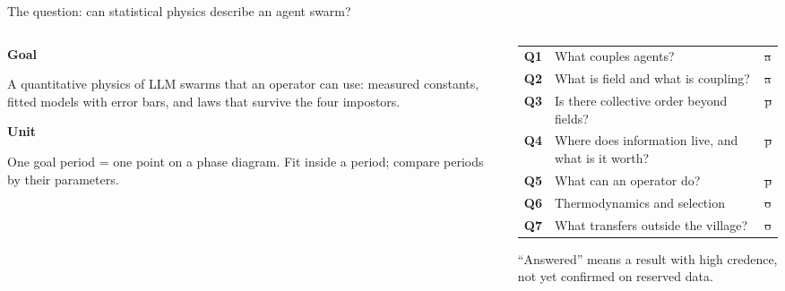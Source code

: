 \begin{frame}{The question: can statistical physics describe an agent swarm?}
\begin{columns}[T,onlytextwidth]
\begin{column}{0.36\textwidth}
\vspace{0.6em}
{\large\bfseries Goal}\par\vspace{0.4em}
A quantitative physics of LLM swarms that an operator can use: measured constants, fitted models with error bars, and laws that survive the four impostors.\par\vspace{0.8em}
{\large\bfseries Unit}\par\vspace{0.4em}
One goal period = one point on a phase diagram. Fit inside a period; compare periods by their parameters.
\end{column}
\begin{column}{0.60\textwidth}
\footnotesize
\renewcommand{\arraystretch}{1.45}
\begin{tabular}{@{}l >{\raggedright\arraybackslash}p{4.6cm} l@{}}
\textbf{Q1} & What couples agents? & \st{a}\\
\textbf{Q2} & What is field and what is coupling? & \st{a}\\
\textbf{Q3} & Is there collective order beyond fields? & \st{p}\\
\textbf{Q4} & Where does information live, and what is it worth? & \st{p}\\
\textbf{Q5} & What can an operator do? & \st{p}\\
\textbf{Q6} & Thermodynamics and selection & \st{o}\\
\textbf{Q7} & What transfers outside the village? & \st{o}\\
\end{tabular}\par\vspace{0.5em}
{\scriptsize\color{muted}``Answered'' means a result with high credence, not yet confirmed on reserved data.}
\end{column}
\end{columns}
\end{frame}

